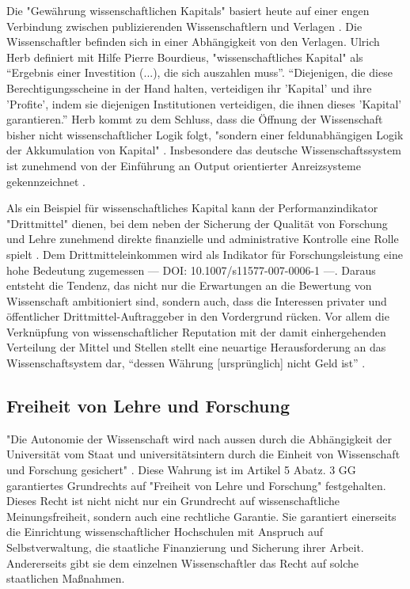 Die "Gewährung wissenschaftlichen Kapitals" basiert heute auf einer engen Verbindung zwischen publizierenden Wissenschaftlern und Verlagen \cite{herb_2006}. Die Wissenschaftler befinden sich in einer Abhängigkeit von den Verlagen. Ulrich Herb definiert mit Hilfe Pierre Bourdieus, "wissenschaftliches Kapital" als “Ergebnis einer Investition (...), die sich auszahlen muss”. “Diejenigen, die diese Berechtigungsscheine in der Hand halten, verteidigen ihr 'Kapital' und ihre 'Profite', indem sie diejenigen Institutionen verteidigen, die ihnen dieses 'Kapital' garantieren.” \cite{Bourdieu_1992} Herb kommt zu dem Schluss, dass die Öffnung der Wissenschaft bisher nicht wissenschaftlicher Logik folgt, "sondern einer feldunabhängigen Logik der Akkumulation von Kapital" \cite{herb_2006}. Insbesondere das deutsche Wissenschaftssystem ist zunehmend von der Einführung an Output orientierter Anreizsysteme gekennzeichnet \cite{osterloh2008anreize}.

Als ein Beispiel für wissenschaftliches Kapital kann der Performanzindikator "Drittmittel" \cite{Jansen_2007} dienen, bei dem neben der Sicherung der Qualität von Forschung und Lehre zunehmend direkte finanzielle und administrative Kontrolle eine Rolle spielt \cite{Barl_sius_2008}. Dem Drittmitteleinkommen wird als Indikator für Forschungsleistung eine hohe Bedeutung zugemessen  --- DOI: 10.1007/s11577-007-0006-1  ---. Daraus entsteht die Tendenz, das nicht nur die Erwartungen an die Bewertung von Wissenschaft ambitioniert sind, sondern auch, dass die Interessen privater und öffentlicher Drittmittel-Auftraggeber in den Vordergrund rücken. Vor allem die Verknüpfung von wissenschaftlicher Reputation mit der damit einhergehenden Verteilung der Mittel und Stellen stellt eine neuartige Herausforderung an das Wissenschaftsystem dar, “dessen Währung [ursprünglich] nicht Geld ist” \cite{hanekop_2006}. 

\subsection{Freiheit von Lehre und Forschung}

"Die Autonomie der Wissenschaft wird nach aussen durch die Abhängigkeit der Universität vom Staat und universitätsintern durch die Einheit von Wissenschaft und Forschung gesichert" \cite{Huber_2005}. Diese Wahrung ist im Artikel 5 Abatz. 3 GG garantiertes Grundrechts auf "Freiheit von Lehre und Forschung" festgehalten. Dieses Recht ist nicht nicht nur ein Grundrecht auf wissenschaftliche Meinungsfreiheit, sondern auch eine rechtliche Garantie. Sie garantiert einerseits die Einrichtung wissenschaftlicher Hochschulen mit Anspruch auf Selbstverwaltung, die staatliche Finanzierung und Sicherung ihrer Arbeit. Andererseits gibt sie dem einzelnen Wissenschaftler das Recht auf solche staatlichen Maßnahmen. 

